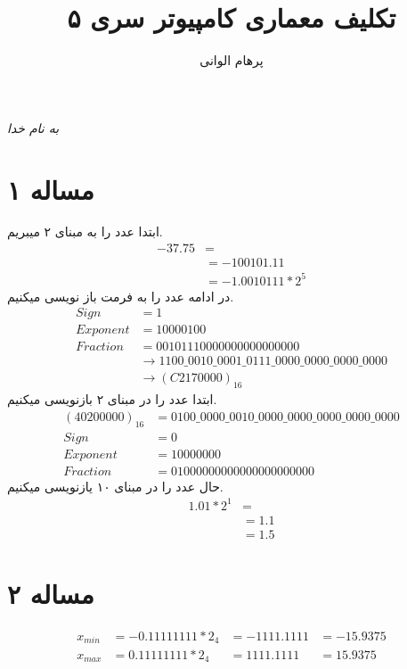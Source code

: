 \documentclass[11pt]{article}
\author{پرهام الوانی}
\title{تکلیف معماری کامپیوتر سری ۵}
\begin{document}
\begin{titlepage}
\begin{center}
\emph{به نام خدا}
\end{center}
\maketitle
\begin{center}
\end{center}
\end{titlepage}
\tableofcontents
\newpage
\section{مساله ۱}
ابتدا عدد را به مبنای ۲ میبریم.
\begin{align*}
	-37.75 &= \\
	&= -100101.11 \\
	&= -1.0010111 * 2^{5}
\end{align*}
در ادامه عدد را به فرمت  باز نویسی میکنیم.
\begin{align*}
	Sign &= 1 \\
	Exponent &= 10000100 \\
	Fraction &= 00101110000000000000000 \\
	&\rightarrow 1100\_0010\_0001\_0111\_0000\_0000\_0000\_0000 \\
	&\rightarrow (C2170000)_{16}
\end{align*}
ابتدا عدد را در مبنای ۲ بازنویسی میکنیم.
\begin{align*}
	(40200000)_{16} &= 0100\_0000\_0010\_0000\_0000\_0000\_0000\_0000 \\
	Sign &= 0 \\
	Exponent &= 10000000 \\
	Fraction &= 01000000000000000000000
\end{align*}
حال عدد را در مبنای ۱۰ یازنویسی میکنیم.
\begin{align*}
	1.01 * 2^{1} &= \\
	&= 1.1 \\
	&= 1.5
\end{align*}

\section{مساله ۲}
\begin{align*}
	x_{min} &= -0.11111111 * 2_{4} &= -1111.1111 &= -15.9375 \\
	x_{max} &=  0.11111111 * 2_{4} &=  1111.1111 &=  15.9375
\end{align*}
\end{document}
